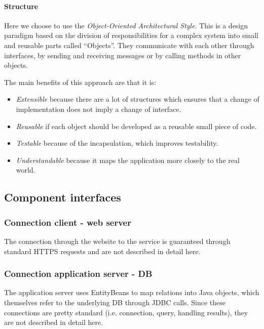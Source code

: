 \paragraph{Structure} Here we choose to use the \emph{Object-Oriented Architectural Style}\cite{ooa}.
This is a design paradigm based on the division of responsibilities for a complex system
into small and reusable parts called ``Objects''.
They communicate with each other through interfaces, by sending and receiving messages
or by calling methods in other objects.

The main benefits of this approach are that it is:

\begin{itemize}
    \item{\emph{Extensible} because there are a lot of structures which ensures that a change of implementation does not imply a change of interface.}
    \item{\emph{Reusable} if each object should be developed as a reusable small piece of code.}
    \item{\emph{Testable} because of the incapsulation, which improves testability.}
    \item{\emph{Understandable} because it maps the application more closely to the real world.}
\end{itemize}

\subsection{Component interfaces}

\subsubsection{Connection client - web server} %
\label{ssub:https}
The connection through the website to the service is guaranteed through standard HTTPS requests and are not described in detail here.

\subsubsection{Connection application server - DB} %
\label{ssub:connection_application_server_db}
The application server uses EntityBeans to map relations into Java objects, which themselves refer to the underlying DB through JDBC calls. Since these connections are pretty standard (i.e. connection, query, handling results), they are not described in detail here.

